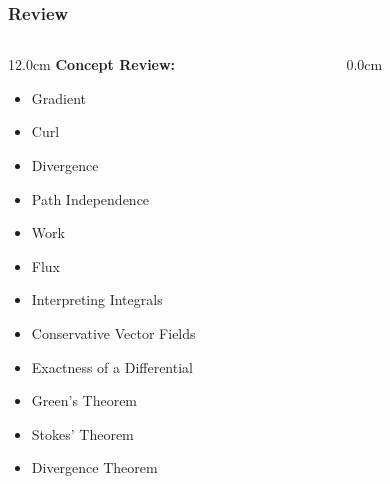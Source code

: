 %
% 

\begin{frame}
\frametitle{\Large {\color[rgb]{0.02,0.20,1.0} Review}}
\scriptsize
\begin{columns}
\begin{column}{12.0cm}
{\bf Concept Review:}

\vspace{0.2cm}

\begin{itemize}
	\item Gradient
	\item Curl
	\item Divergence
	\item Path Independence
	\item Work
	\item Flux
	\item Interpreting Integrals
	\item Conservative Vector Fields
	\item Exactness of a Differential
	\item Green's Theorem
	\item Stokes' Theorem
	\item Divergence Theorem
\end{itemize}

\vspace{0.2cm}

\end{column}
\begin{column}{0.0cm}\end{column}
\end{columns}
\end{frame}

